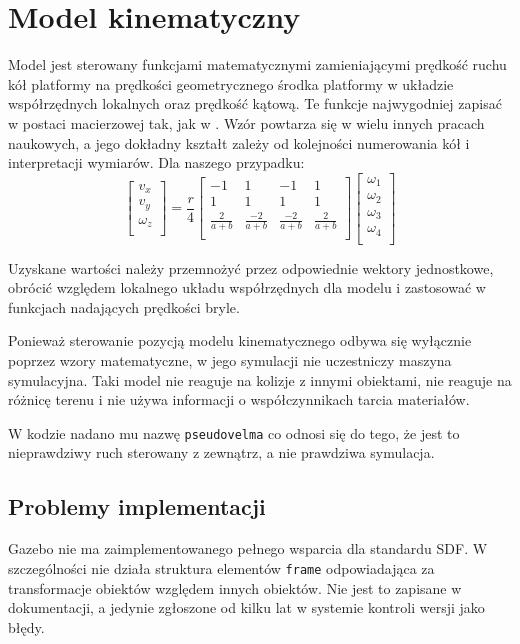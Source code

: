 \section{Model kinematyczny}
Model jest sterowany funkcjami matematycznymi zamieniającymi prędkość ruchu kół platformy na prędkości geometrycznego środka platformy w układzie współrzędnych lokalnych oraz prędkość kątową.
Te funkcje najwygodniej zapisać w postaci macierzowej tak, jak w \cite{wheels}. Wzór powtarza się w wielu innych pracach naukowych, a jego dokładny kształt zależy od kolejności numerowania kół i interpretacji wymiarów.
Dla naszego przypadku:
\[
 \begin{bmatrix}
  v_x \\
  v_y \\
  \omega_z \\
 \end{bmatrix}
 =
 \frac{r}{4}
 \begin{bmatrix}
  -1 & 1 & -1 & 1 \\
  1 & 1 & 1 & 1 \\
  \frac{2}{a+b} & \frac{-2}{a+b} & \frac{-2}{a+b} & \frac{2}{a+b} \\
 \end{bmatrix}
\begin{bmatrix}
 \omega_1 \\
 \omega_2 \\
 \omega_3 \\
 \omega_4 \\
\end{bmatrix}
\]

Uzyskane wartości należy przemnożyć przez odpowiednie wektory jednostkowe, obrócić względem lokalnego układu współrzędnych dla modelu i zastosować w funkcjach nadających prędkości bryle.

Ponieważ sterowanie pozycją modelu kinematycznego odbywa się wyłącznie poprzez wzory matematyczne, w jego symulacji nie uczestniczy maszyna symulacyjna.
Taki model nie reaguje na kolizje z innymi obiektami, nie reaguje na różnicę terenu i nie używa informacji o współczynnikach tarcia materiałów.

W kodzie nadano mu nazwę \texttt{pseudovelma} co odnosi się do tego, że jest to nieprawdziwy ruch sterowany z zewnątrz, a nie prawdziwa symulacja.

\subsection{Problemy implementacji}
Gazebo nie ma zaimplementowanego pełnego wsparcia dla standardu SDF.
W szczególności nie działa struktura elementów \texttt{frame} odpowiadająca za transformacje obiektów względem innych obiektów.
Nie jest to zapisane w dokumentacji, a jedynie zgłoszone od kilku lat w systemie kontroli wersji jako błędy.

